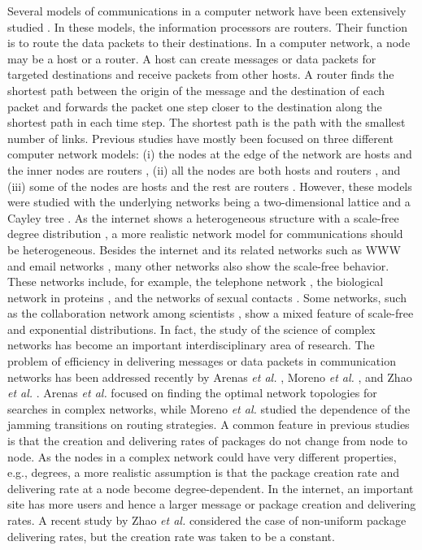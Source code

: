 \documentclass[aps,prl,twocolumn,superscriptaddress,showpacs]{revtex4}
\begin{document}
Several models of communications in a computer network have been
extensively studied \cite{Li:1989,Leland:1993,Taqqu:1997,
Crove:1997,Falout:1999,Toru:1998,Fuks:1999,Sole:2001,Arena:2001,
Guim:2001,Guim:2002,Woolf:2002,Valv:2002}.  In these models, the
information processors are routers. Their function is to route the
data packets to their destinations.  In a computer network, a node
may be a host or a router. A host can create messages or data
packets for targeted destinations and receive packets from other
hosts. A router finds the shortest path between the origin of the
message and the destination of each packet and forwards the packet
one step closer to the destination along the shortest path in each
time step. The shortest path is the path with the smallest number
of links. Previous studies have mostly been focused on three
different computer network models: (i) the nodes at the edge of
the network are hosts and the inner nodes are routers
\cite{Toru:1998}, (ii) all the nodes are both hosts and routers
\cite{Fuks:1999,Guim:2001,Guim:2002}, and (iii) some of the nodes
are hosts and the rest are routers
\cite{Sole:2001,Woolf:2002,Valv:2002}.  However, these models were
studied with the underlying networks being a two-dimensional
lattice \cite{Toru:1998,Fuks:1999,Sole:2001, Woolf:2002} and a
Cayley tree \cite{Arena:2001,Guim:2001,Guim:2002}.  As the
internet shows a heterogeneous structure with a scale-free degree
distribution \cite{Past:2001,Alex:2002}, a more realistic network
model for communications should be heterogeneous. Besides the
internet and its related networks such as WWW \cite
{Albe:1999,Huber:1999,Kahn:2002} and email networks
\cite{Ebel:2002}, many other networks also show the scale-free
behavior.  These networks include, for example, the telephone
network \cite{Aiello:2000}, the biological network in proteins
\cite{Jeong:2001}, and the networks of sexual contacts
\cite{Fred:2001, Erg:2002}.  Some networks, such as the
collaboration network among scientists \cite{Newm:2001}, show a
mixed feature of scale-free and exponential distributions.  In
fact, the study of the science of complex networks has become an
important interdisciplinary area of research.  The problem of
efficiency in delivering messages or data packets in communication
networks has been addressed recently by Arenas {\em et al.}
\cite{arenas1:2002,arenas2:2004,arenas3:2003}, Moreno {\em et al.}
\cite{moreno1:2003,moreno2:2004,moreno3:2004}, and Zhao {\em et
al.} \cite{zhao:2005}.  Arenas {\em et al.} focused on finding the
optimal network topologies for searches in complex networks, while
Moreno {\em et al.} studied the dependence of the jamming
transitions on routing strategies.  A common feature in previous
studies is that the creation and delivering rates of packages do
not change from node to node.  As the nodes in a complex network
could have very different properties, e.g., degrees, a more
realistic assumption is that the package creation rate and
delivering rate at a node become degree-dependent.  In the
internet, an important site has more users and hence a larger
message or package creation and delivering rates.  A recent study
by Zhao {\em et al.} \cite{zhao:2005} considered the case of
non-uniform package delivering rates, but the creation rate was
taken to be a constant.
\end{document}
